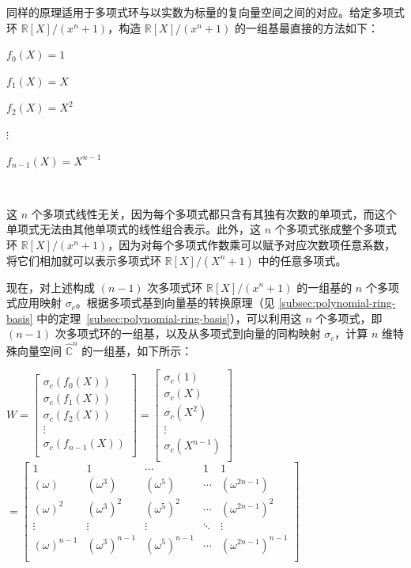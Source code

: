同样的原理适用于多项式环与以实数为标量的复向量空间之间的对应。给定多项式环 $\mathbb{R}[X]/(x^n + 1)$，构造 $\mathbb{R}[X]/(x^n + 1)$ 的一组基最直接的方法如下：

$f_0(X) = 1$

$f_1(X) = X$

$f_2(X) = X^2$

$\vdots$

$f_{n-1}(X) = X^{n-1}$

$ $

这 $n$ 个多项式线性无关，因为每个多项式都只含有其独有次数的单项式，而这个单项式无法由其他单项式的线性组合表示。此外，这 $n$ 个多项式张成整个多项式环 $\mathbb{R}[X]/(x^n + 1)$，因为对每个多项式作数乘可以赋予对应次数项任意系数，将它们相加就可以表示多项式环 $\mathbb{R}[X]/(X^n + 1)$ 中的任意多项式。


现在，对上述构成 $(n-1)$ 次多项式环 $\mathbb{R}[X]/(x^n + 1)$ 的一组基的 $n$ 个多项式应用映射 $\sigma_c$。根据多项式基到向量基的转换原理（见 \autoref{subsec:polynomial-ring-basis} 中的定理~\ref*{subsec:polynomial-ring-basis}），可以利用这 $n$ 个多项式，即 $(n-1)$ 次多项式环的一组基，以及从多项式到向量的同构映射 $\sigma_c$，计算 $n$ 维特殊向量空间 $\hat{\mathbb C}^{n}$ 的一组基，如下所示：

$W = \begin{bmatrix}
\sigma_c(f_0(X)) \\
\sigma_c(f_1(X)) \\
\sigma_c(f_2(X)) \\
\vdots \\
\sigma_c(f_{n-1}(X)) \\
\end{bmatrix}
= \begin{bmatrix}
\sigma_c(1) \\
\sigma_c(X) \\
\sigma_c(X^2) \\
\vdots \\
\sigma_c(X^{n-1}) \\
\end{bmatrix}$
$= \begin{bmatrix}
1 & 1 & \cdots & 1 & 1\\
(\omega) & (\omega^3) & (\omega^5) & \cdots & (\omega^{2n-1})\\
(\omega)^2 & (\omega^3)^2 & (\omega^5)^2 & \cdots & (\omega^{2n-1})^2\\
\vdots & \vdots & \vdots & \ddots & \vdots \\
(\omega)^{n-1} & (\omega^3)^{n-1} & (\omega^5)^{n-1} & \cdots & (\omega^{2n-1})^{n-1}\\
\end{bmatrix}$

